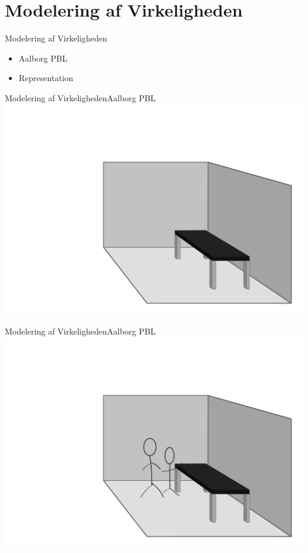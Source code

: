 \newcommand{\modelreality}{Modelering af Virkeligheden}
\newcommand{\topicone}{Aalborg PBL}
\newcommand{\topictwo}{Representation}
\newcommand{\topicthree}{Design}
\section*{\modelreality}

\begin{frame}{\modelreality}
\begin{itemize}
	\item \topicone
	\item \topictwo
\end{itemize}
\end{frame}
\begin{frame}{\modelreality}{\topicone} 
\includegraphics[width=\columnwidth]{input/rasmus/Rasmus1.pdf}
\end{frame}
\begin{frame}{\modelreality}{\topicone} 
\includegraphics[width=\columnwidth]{input/rasmus/Rasmus2.pdf}
\end{frame}
